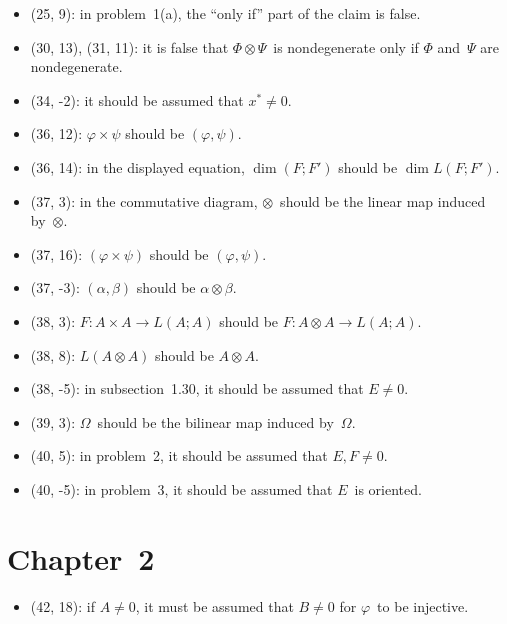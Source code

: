 \documentclass[letterpaper,12pt]{article}
\newcommand{\tprod}{\otimes}
\begin{document}
\begin{itemize}
\item (25, 9): in problem~1(a), the ``only if'' part of the claim is false.
\item (30, 13), (31, 11): it is false that \(\Phi\tprod\Psi\)~is nondegenerate only if \(\Phi\) and~\(\Psi\) are nondegenerate.
\item (34, -2): it should be assumed that \(x^*\ne 0\).
\item (36, 12): \(\varphi\times\psi\) should be \((\varphi,\psi)\).
\item (36, 14): in the displayed equation, \(\dim(F;F')\) should be \(\dim L(F;F')\).
\item (37, 3): in the commutative diagram, \(\tprod\)~should be the linear map induced by~\(\tprod\).
\item (37, 16): \((\varphi\times\psi)\) should be \((\varphi,\psi)\).
\item (37, -3): \((\alpha,\beta)\) should be \(\alpha\tprod\beta\).
\item (38, 3): \(F:A\times A\to L(A;A)\) should be \(F:A\tprod A\to L(A;A)\).
\item (38, 8): \(L(A\tprod A)\) should be \(A\tprod A\).
\item (38, -5): in subsection~1.30, it should be assumed that \(E\ne 0\).
\item (39, 3): \(\Omega\)~should be the bilinear map induced by~\(\Omega\).
\item (40, 5): in problem~2, it should be assumed that \(E,F\ne 0\).
\item (40, -5): in problem~3, it should be assumed that \(E\)~is oriented.
\end{itemize}

\section*{Chapter~2}
\begin{itemize}
\item (42, 18): if \(A\ne 0\), it must be assumed that \(B\ne 0\) for \(\varphi\)~to be injective.
\end{itemize}
\end{document}
